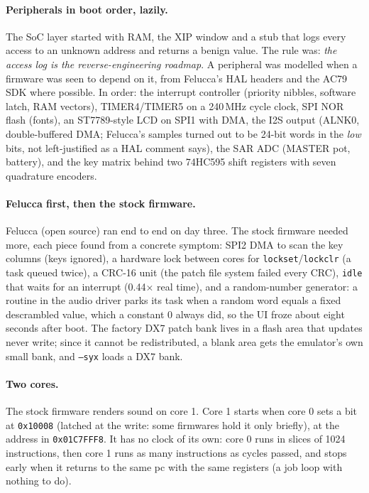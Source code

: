 \documentclass[10pt,a4paper]{article}
\newcommand{\code}[1]{\texttt{#1}}
\begin{document}
\paragraph{Peripherals in boot order, lazily.} The SoC layer started with RAM, the XIP window and a
stub that logs every access to an unknown address and returns a benign value. The rule was:
\emph{the access log is the reverse-engineering roadmap}. A peripheral was modelled when a firmware
was seen to depend on it, from Felucca's HAL headers and the AC79 SDK where possible. In order:
the interrupt controller (priority nibbles, software latch, RAM vectors), TIMER4/TIMER5 on a
240\,MHz cycle clock, SPI NOR flash (fonts), an ST7789-style LCD on SPI1 with DMA, the I2S output
(ALNK0, double-buffered DMA; Felucca's samples turned out to be 24-bit words in the \emph{low}
bits, not left-justified as a HAL comment says), the SAR ADC (MASTER pot, battery), and the key
matrix behind two 74HC595 shift registers with seven quadrature encoders.

\paragraph{Felucca first, then the stock firmware.} Felucca (open source) ran end to end on day
three. The stock firmware needed more, each piece found from a concrete symptom: SPI2 DMA to scan the
key columns (keys ignored), a hardware lock between cores for \code{lockset}/\code{lockclr} (a task
queued twice), a CRC-16 unit (the patch file system failed every CRC), \code{idle} that waits for an
interrupt (0.44$\times$ real time), and a random-number generator: a routine in the audio driver
parks its task when a random word equals a fixed descrambled value, which a constant 0 always did,
so the UI froze about eight seconds after boot. The factory DX7 patch bank lives in a flash area
that updates never write; since it cannot be redistributed, a blank area gets the emulator's own
small bank, and \code{--syx} loads a DX7 bank.

\paragraph{Two cores.} The stock firmware renders sound on core 1. Core 1 starts when core 0 sets a
bit at \code{0x10008} (latched at the write: some firmwares hold it only briefly), at the address in
\code{0x01C7FFF8}. It has no clock of its own: core 0 runs in slices of 1024 instructions, then core
1 runs as many instructions as cycles passed, and stops early when it returns to the same pc with
the same registers (a job loop with nothing to do).
\end{document}
